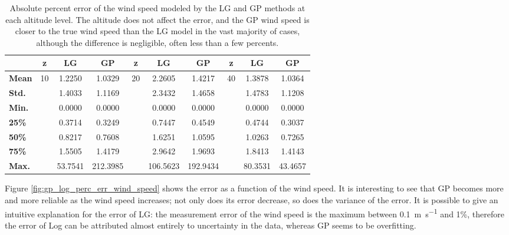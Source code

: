\documentclass[a4paper]{book}
\begin{document}
\begin{table}[]
\centering
\caption{Absolute percent error of the wind speed modeled by the LG and GP methods at each altitude level. The altitude does not affect the error, and the GP wind speed is closer to the true wind speed than the LG model in the vast majority of cases, although the difference is negligible, often less than a few percents.}
\label{tbl:model_wind_errors}
\begin{tabular*}{\textwidth}{l @{\extracolsep{\fill}} |ccc|ccc|ccc}
\toprule
& \textbf{z} & \textbf{LG} & \textbf{GP} & \textbf{z} & \textbf{LG} & \textbf{GP} & \textbf{z} & \textbf{LG} & \textbf{GP} \\\midrule
\textbf{Mean} & \multirow{7}{*}{ 10 } & 1.2250 & 1.0329 & \multirow{7}{*}{ 20 } & 2.2605 & 1.4217 & \multirow{7}{*}{ 40 } & 1.3878 & 1.0364 \\
\textbf{Std.}& & 1.4033 & 1.1169 & & 2.3432 & 1.4658 & & 1.4783 & 1.1208 \\
\textbf{Min.} & & 0.0000 & 0.0000 & & 0.0000 & 0.0000 & & 0.0000 & 0.0000 \\
\textbf{25\%} & & 0.3714 & 0.3249 & & 0.7447 & 0.4549 & & 0.4744 & 0.3037 \\
\textbf{50\%} & & 0.8217 & 0.7608 & & 1.6251 & 1.0595 & & 1.0263 & 0.7265 \\
\textbf{75\%} & & 1.5505 & 1.4179 & & 2.9642 & 1.9693 & & 1.8413 & 1.4143 \\
\textbf{Max.} & & 53.7541 & 212.3985 & & 106.5623 & 192.9434 & & 80.3531 & 43.4657 \\
\bottomrule
\end{tabular*} 
\end{table}


Figure \ref{fig:gp_log_perc_err_wind_speed} shows the error as a function of the wind speed. It is interesting to see that GP becomes more and more reliable as the wind speed increases; not only does its error decrease, so does the variance of the error. It is possible to give an intuitive explanation for the error of LG: the measurement error of the wind speed is the maximum between \SI{0.1}{\meter\per\second} and 1\%, therefore the error of Log can be attributed almost entirely to uncertainty in the data, whereas GP seems to be overfitting.
\end{document}
